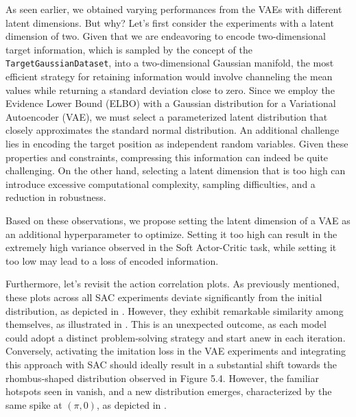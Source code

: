 As seen earlier, we obtained varying performances from the VAEs with different latent dimensions. But why? Let's first consider the experiments with a latent dimension of two. Given that we are endeavoring to encode two-dimensional target information, which is sampled by the concept of the \texttt{TargetGaussianDataset}, into a two-dimensional Gaussian manifold, the most efficient strategy for retaining information would involve channeling the mean values while returning a standard deviation close to zero. Since we employ the Evidence Lower Bound (ELBO) with a Gaussian distribution for a Variational Autoencoder (VAE), we must select a parameterized latent distribution that closely approximates the standard normal distribution. An additional challenge lies in encoding the target position as independent random variables. Given these properties and constraints, compressing this information can indeed be quite challenging. On the other hand, selecting a latent dimension that is too high can introduce excessive computational complexity, sampling difficulties, and a reduction in robustness.

Based on these observations, we propose setting the latent dimension of a VAE as an additional hyperparameter to optimize. Setting it too high can result in the extremely high variance observed in the Soft Actor-Critic task, while setting it too low may lead to a loss of encoded information.

Furthermore, let's revisit the action correlation plots. As previously mentioned, these plots across all SAC experiments deviate significantly from the initial distribution, as depicted in . However, they exhibit remarkable similarity among themselves, as illustrated in . This is an unexpected outcome, as each model could adopt a distinct problem-solving strategy and start anew in each iteration. Conversely, activating the imitation loss in the VAE experiments and integrating this approach with SAC should ideally result in a substantial shift towards the rhombus-shaped distribution observed in Figure 5.4. However, the familiar hotspots seen in  vanish, and a new distribution emerges, characterized by the same spike at $(\pi, 0)$, as depicted in .

